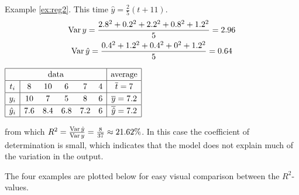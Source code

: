 \begin{tcolorbox}[exstyle]{}
\begin{description}
	  \begin{minipage}[t]{0.57\linewidth}\vspace{0pt}
		  \item[Example \ref{ex:reg2}.]\lstsp This time $\hat y=\frac 25(t+11)$.
		  \begin{gather*}
			  \operatorname{Var} y=\frac{2.8^2+0.2^2+2.2^2+0.8^2+1.2^2}5 =2.96\\
			  \operatorname{Var}\hat y=\frac{0.4^2+1.2^2+0.4^2+0^2+1.2^2}5=0.64
		  \end{gather*}
		\end{minipage}
		\hfill
		\begin{minipage}[t]{0.42\linewidth}\vspace{0pt}
			\flushright
			$\renewcommand{\arraystretch}{1.2}
			\begin{array}{|c|ccccc|c|}
				\hline
				\multicolumn{6}{|c|}{\text{data}}&\text{average}\\\hline
				t_i&8&10&6&7&4&\cl t=7\\\hline
				y_i&10&7&5&8&6&\cl y=7.2\\\hline
				\hat y_i&7.6&8.4&6.8&7.2&6&\cl{\hat y}=7.2\\\hline
			\end{array}$
		\end{minipage}\par
	 	from which $R^2=\frac{\operatorname{Var}\hat y}{\operatorname{Var} y}=\frac{8}{37}\approx 21.62\%$. In this case the coefficient of determination is small, which indicates that the model does not explain much of the variation in the output.
	\end{description}
\end{tcolorbox}

The four examples are plotted below for easy visual comparison between the $R^2$-values.

